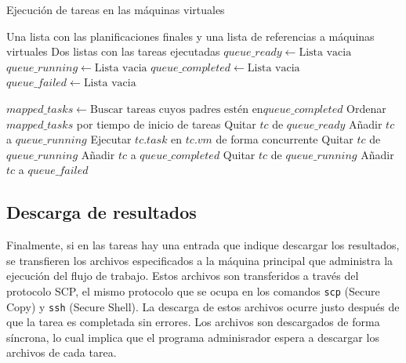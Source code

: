\begin{algorithm}
\caption{Ejecuci\'on de tareas en las m\'aquinas virtuales}
\label{alg_manage_execution}
\begin{algorithmic}
\Require Una lista con las planificaciones finales y una lista de referencias a m\'aquinas virtuales
\Ensure Dos listas con las tareas ejecutadas
    \State $queue\_ready \gets \text{Lista vacia}$
    \State $queue\_running \gets \text{Lista vacia}$
    \State $queue\_completed \gets \text{Lista vacia}$
    \State $queue\_failed \gets \text{Lista vacia}$

    \EndFor

        \State $mapped\_tasks \gets \text{Buscar tareas cuyos padres est\'en en} queue\_completed$
        \State Ordenar $mapped\_tasks$ por tiempo de inicio de tareas
            \State Quitar $tc$ de $queue\_ready$
            \State Añadir $tc$ a $queue\_running$
            \State Ejecutar $tc.task$ en $tc.vm$ de forma concurrente
        \EndFor
                \State Quitar $tc$ de $queue\_running$
                \State Añadir $tc$ a $queue\_completed$
                \State Quitar $tc$ de $queue\_running$
                \State Añadir $tc$ a $queue\_failed$
            \EndIf
        \EndFor
    \EndWhile
\EndProcedure
\end{algorithmic}
\end{algorithm}


\subsection{Descarga de resultados}

Finalmente, si en las tareas hay una entrada que indique descargar los resultados, se transfieren los archivos especificados a la máquina principal que administra la ejecuci\'on del flujo de trabajo. Estos archivos son transferidos a trav\'es del protocolo SCP, el mismo protocolo \cite{rfc4251} que se ocupa en los comandos \texttt{scp} (Secure Copy) y \texttt{ssh} (Secure Shell). La descarga de estos archivos ocurre justo despu\'es de que la tarea es completada sin errores. Los archivos son descargados de forma s\'incrona, lo cual implica que el programa adminisrador espera a descargar los archivos de cada tarea.


